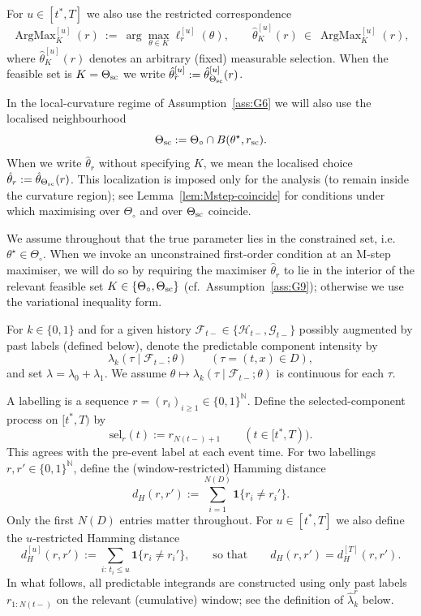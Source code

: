 \documentclass{statsoc}
\newcommand{\1}{\mathbbm{1}}
\newcommand{\bbN}{\mathbb{N}}
\begin{document}
For $u\in[t^\ast,T]$ we also use the restricted correspondence
\[
\operatorname{ArgMax}_K^{[u]}(r)\ :=\ \arg\max_{\theta\in K}\ell_r^{[u]}(\theta),
\qquad
\hat\theta_K^{[u]}(r)\ \in\ \operatorname{ArgMax}_K^{[u]}(r),
\]
where $\hat\theta_K^{[u]}(r)$ denotes an arbitrary (fixed) measurable selection.
When the feasible set is $K=\Theta_{\rm sc}$ we write $\hat\theta_r^{[u]}:=\hat\theta_{\Theta_{\rm sc}}^{[u]}(r)$.

In the local-curvature regime of Assumption~\ref{ass:G6} we will also use the localised neighbourhood
\[
\Theta_{\rm sc}:=\Theta_\circ\cap B(\theta^\star,r_{\rm sc}).
\]
When we write $\hat\theta_r$ without specifying $K$, we mean the localised choice
$\hat\theta_r:=\hat\theta_{\Theta_{\rm sc}}(r)$. This localization is imposed only for the analysis (to remain inside the curvature region); see Lemma~\ref{lem:Mstep-coincide} for conditions under which maximising over $\Theta_\circ$ and over $\Theta_{\rm sc}$ coincide.

We assume throughout that the true parameter lies in the constrained set, i.e.\ $\theta^\star\in\Theta_\circ$. When we invoke an unconstrained first-order condition at an M-step maximiser, we will do so by requiring the maximiser $\hat\theta_r$ to lie in the interior of the relevant feasible set $K\in\{\Theta_\circ,\Theta_{\rm sc}\}$ (cf.\ Assumption~\ref{ass:G9}); otherwise we use the variational inequality form.

For $k\in\{0,1\}$ and for a given history $\mathcal F_{t-}\in\{\mathcal H_{t-},\mathcal G_{t-}\}$ possibly augmented by past labels (defined below), denote the predictable component intensity by
\[
\lambda_k(\tau\mid \mathcal F_{t-};\theta)\qquad(\tau=(t,x)\in D),
\]
and set $\lambda=\lambda_0+\lambda_1$. We assume $\theta\mapsto \lambda_k(\tau\mid \mathcal F_{t-};\theta)$ is continuous for each $\tau$.

A labelling is a sequence $r=(r_i)_{i\ge 1}\in\{0,1\}^{\bbN}$. Define the selected-component process on $[t^\ast,T)$ by
\begin{equation}\label{eq:sel-def}
\mathrm{sel}_r(t):=r_{N(t-)+1}\qquad (t\in[t^\ast,T)).
\end{equation}
This agrees with the pre-event label at each event time. For two labellings $r,r'\in\{0,1\}^{\bbN}$, define the (window-restricted) Hamming distance
\[
d_H(r,r'):=\sum_{i=1}^{N(D)} \mathbf 1\{r_i\neq r_i'\}.
\]
Only the first $N(D)$ entries matter throughout. For $u\in[t^\ast,T]$ we also define the
$u$-restricted Hamming distance
\[
d_H^{[u]}(r,r'):=\sum_{i:\,t_i\le u} \mathbf 1\{r_i\neq r_i'\},
\qquad\text{so that}\qquad
d_H(r,r')=d_H^{[T]}(r,r').
\]
In what follows, all predictable integrands are constructed using only past labels $r_{1:N(t-)}$ on the relevant (cumulative) window; see the definition of $\widehat\lambda_k^r$ below.
\end{document}
